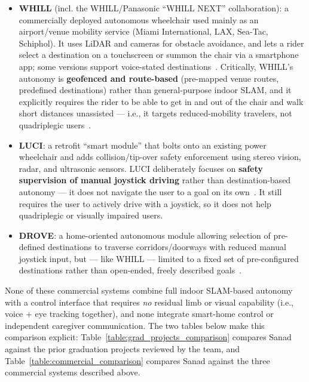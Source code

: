 \begin{itemize}
    \item \textbf{WHILL} (incl. the WHILL/Panasonic ``WHILL NEXT'' collaboration): a commercially deployed autonomous wheelchair used mainly as an airport/venue mobility service (Miami International, LAX, Sea-Tac, Schiphol). It uses LiDAR and cameras for obstacle avoidance, and lets a rider select a destination on a touchscreen or summon the chair via a smartphone app; some versions support voice-stated destinations~\cite{whill2025product, whill2026autonomousservice, thedrive2019selfdriving, runwaygirl2024whill, fte2024schiphol}. Critically, WHILL's autonomy is \textbf{geofenced and route-based} (pre-mapped venue routes, predefined destinations) rather than general-purpose indoor SLAM, and it explicitly requires the rider to be able to get in and out of the chair and walk short distances unassisted --- i.e., it targets reduced-mobility travelers, not quadriplegic users~\cite{runwaygirl2024whill, djph2026autonomousdeployment}.
    \item \textbf{LUCI}: a retrofit ``smart module'' that bolts onto an existing power wheelchair and adds collision/tip-over safety enforcement using stereo vision, radar, and ultrasonic sensors. LUCI deliberately focuses on \textbf{safety supervision of manual joystick driving} rather than destination-based autonomy --- it does not navigate the user to a goal on its own~\cite{sunrisemedical2022luci, djph2026autonomousdeployment}. It still requires the user to actively drive with a joystick, so it does not help quadriplegic or visually impaired users.
    \item \textbf{DROVE}: a home-oriented autonomous module allowing selection of pre-defined destinations to traverse corridors/doorways with reduced manual joystick input, but --- like WHILL --- limited to a fixed set of pre-configured destinations rather than open-ended, freely described goals~\cite{djph2026autonomousdeployment}.
\end{itemize}

None of these commercial systems combine full indoor SLAM-based autonomy with a control interface that requires \emph{no} residual limb or visual capability (i.e., voice + eye tracking together), and none integrate smart-home control or independent caregiver communication. The two tables below make this comparison explicit: Table~\ref{table:grad_projects_comparison} compares Sanad against the prior graduation projects reviewed by the team, and Table~\ref{table:commercial_comparison} compares Sanad against the three commercial systems described above.

